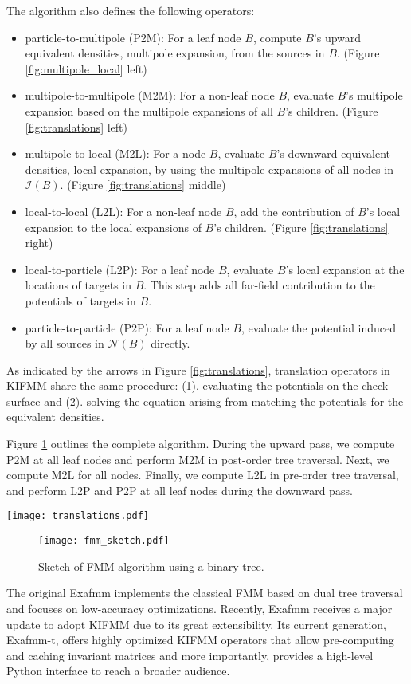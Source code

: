 The algorithm also defines the following operators:
%
\begin{itemize}
    \item particle-to-multipole (P2M): For a leaf node $B$, compute $B$'s upward equivalent densities, \ie multipole expansion, from the sources in $B$. (Figure \ref{fig:multipole_local} left)
    \item multipole-to-multipole (M2M): For a non-leaf node $B$, evaluate $B$'s multipole expansion based on the multipole expansions of all $B$'s children. (Figure \ref{fig:translations} left)
    \item multipole-to-local (M2L): For a node $B$, evaluate $B$'s downward equivalent densities, \ie local expansion, by using the multipole expansions of all nodes in $\mathcal{I}(B)$. (Figure \ref{fig:translations} middle)
    \item local-to-local (L2L): For a non-leaf node $B$, add the contribution of $B$'s local expansion to the local expansions of $B$'s children. (Figure \ref{fig:translations} right)
    \item local-to-particle (L2P): For a leaf node $B$, evaluate $B$'s local expansion at the locations of targets in $B$.
    This step adds all far-field contribution to the potentials of targets in $B$. 
    \item particle-to-particle (P2P): For a leaf node $B$, evaluate the potential induced by all sources in $\mathcal{N}(B)$ directly.
\end{itemize}
%
As indicated by the arrows in Figure \ref{fig:translations}, translation operators in KIFMM share the same procedure: (1). evaluating the potentials on the check surface and (2). solving the equation arising from matching the potentials for the equivalent densities.

Figure \ref{fig:fmm_sketch} outlines the complete \fmm algorithm.
During the upward pass, we compute P2M at all leaf nodes and perform M2M in post-order tree traversal.
Next, we compute M2L for all nodes.
Finally, we compute L2L in pre-order tree traversal, and perform L2P and P2P at all leaf nodes during the downward pass.

\begin{figure*}
    \centering
    \texttt{[image: translations.pdf]}
    \caption{M2M (left), M2L (middle) and L2L (right) operators in KIFMM. Node $C$ is the parent of $B$, and node $A$ is in the interaction list of $B$.}
    \label{fig:translations}
\end{figure*}

\begin{figure}
    \centering
    \texttt{[image: fmm\_sketch.pdf]}
    \caption{Sketch of FMM algorithm using a binary tree.}
    \label{fig:fmm_sketch}
\end{figure}

The original Exafmm \cite{yokota2012tuned,yokota2013fmm} implements the classical FMM based on dual tree traversal and focuses on low-accuracy optimizations.
Recently, Exafmm receives a major update to adopt KIFMM due to its great extensibility.
Its current generation, Exafmm-t, offers highly optimized KIFMM operators that allow pre-computing and caching invariant matrices and more importantly, provides a high-level Python interface to reach a broader audience.